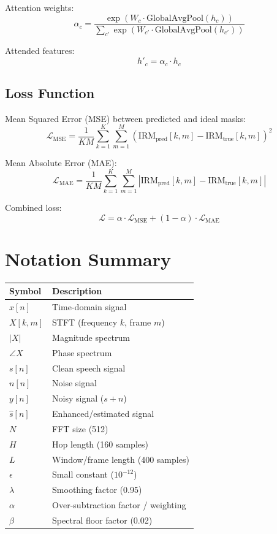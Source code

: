\documentclass[12pt,a4paper]{article}
\begin{document}
Attention weights:
\begin{equation}
\alpha_c = \frac{\exp(W_c \cdot \text{GlobalAvgPool}(h_c))}{\sum_{c'} \exp(W_{c'} \cdot \text{GlobalAvgPool}(h_{c'}))}
\end{equation}

Attended features:
\begin{equation}
h'_c = \alpha_c \cdot h_c
\end{equation}

\subsection{Loss Function}

Mean Squared Error (MSE) between predicted and ideal masks:
\begin{equation}
\mathcal{L}_{\text{MSE}} = \frac{1}{KM} \sum_{k=1}^{K} \sum_{m=1}^{M} (\text{IRM}_{\text{pred}}[k,m] - \text{IRM}_{\text{true}}[k,m])^2
\end{equation}

Mean Absolute Error (MAE):
\begin{equation}
\mathcal{L}_{\text{MAE}} = \frac{1}{KM} \sum_{k=1}^{K} \sum_{m=1}^{M} |\text{IRM}_{\text{pred}}[k,m] - \text{IRM}_{\text{true}}[k,m]|
\end{equation}

Combined loss:
\begin{equation}
\mathcal{L} = \alpha \cdot \mathcal{L}_{\text{MSE}} + (1-\alpha) \cdot \mathcal{L}_{\text{MAE}}
\end{equation}

\section{Notation Summary}

\begin{tabular}{ll}
\hline
Symbol & Description \\
\hline
$x[n]$ & Time-domain signal \\
$X[k,m]$ & STFT (frequency $k$, frame $m$) \\
$|X|$ & Magnitude spectrum \\
$\angle X$ & Phase spectrum \\
$s[n]$ & Clean speech signal \\
$n[n]$ & Noise signal \\
$y[n]$ & Noisy signal ($s + n$) \\
$\hat{s}[n]$ & Enhanced/estimated signal \\
$N$ & FFT size (512) \\
$H$ & Hop length (160 samples) \\
$L$ & Window/frame length (400 samples) \\
$\epsilon$ & Small constant ($10^{-12}$) \\
$\lambda$ & Smoothing factor (0.95) \\
$\alpha$ & Over-subtraction factor / weighting \\
$\beta$ & Spectral floor factor (0.02) \\
\hline
\end{tabular}
\end{document}
